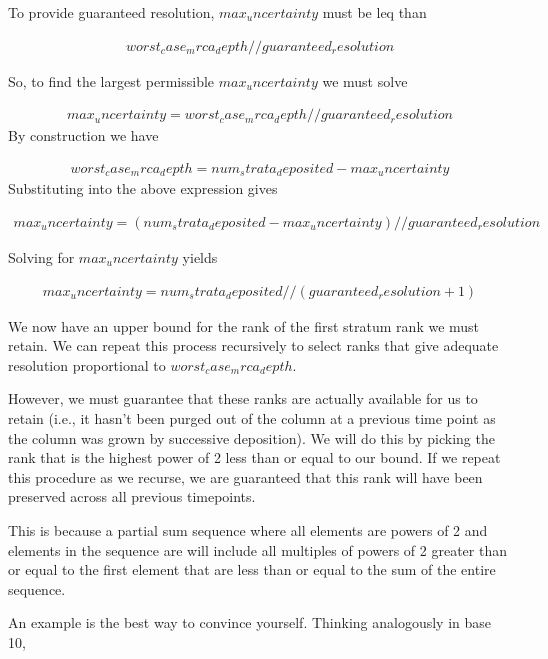 To provide guaranteed resolution, $max_uncertainty$ must be leq than

\begin{align*}
   worst_case_mrca_depth // guaranteed_resolution
\end{align*}

So, to find the largest permissible $max_uncertainty$ we must solve

\begin{align*}
   max_uncertainty = worst_case_mrca_depth // guaranteed_resolution
\end{align*}
By construction we have

\begin{align*}
   worst_case_mrca_depth = num_strata_deposited - max_uncertainty
\end{align*}
Substituting into the above expression gives

\begin{align*}
   max_uncertainty
   = (num_strata_deposited - max_uncertainty) // guaranteed_resolution
\end{align*}

Solving for $max_uncertainty$ yields

\begin{align*}
  max_uncertainty
  = num_strata_deposited // (guaranteed_resolution + 1)
\end{align*}

We now have an upper bound for the rank of the first stratum rank
we must retain. We can repeat this process recursively to select
ranks that give adequate resolution proportional to
$worst_case_mrca_depth$.

However, we must guarantee that these ranks are actually available for
us to retain (i.e., it hasn't been purged out of the column at a
previous time point as the column was grown by successive deposition).
We will do this by picking the rank that is the highest power of 2
less than or equal to our bound. If we repeat this procedure as we
recurse, we are guaranteed that this rank will have been preserved
across all previous timepoints.

This is because a partial sum sequence where all elements are powers
of 2 and elements in the sequence are will include all multiples of
powers of 2 greater than or equal to the first element that are less
than or equal to the sum of the entire
sequence.

An example is the best way to convince yourself. Thinking analogously
in base 10,

